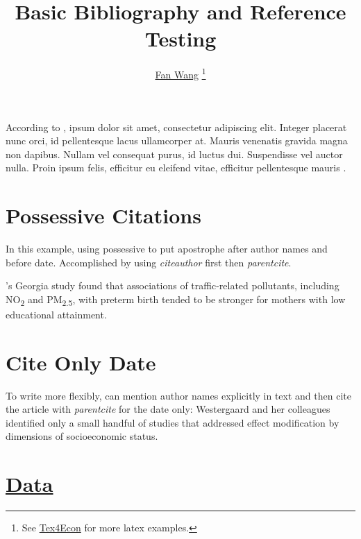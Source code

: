\documentclass[12pt,english]{article}
\begin{document}
\title{Basic Bibliography and Reference Testing}
\author{\href{http://fanwangecon.github.io/}{Fan Wang} \thanks{See \href{https://fanwangecon.github.io/Tex4Econ/}{Tex4Econ} for more latex examples.}}

\maketitle

According to \textcite{becker_human_1986}, ipsum dolor sit amet, consectetur adipiscing elit. Integer placerat nunc orci, id pellentesque lacus ullamcorper at. Mauris venenatis gravida magna non dapibus. Nullam vel consequat purus, id luctus dui. Suspendisse vel auctor nulla. Proin ipsum felis, efficitur eu eleifend vitae, efficitur pellentesque mauris \autocite{case_lasting_2005, conti_understanding_2010}.

\section{Possessive Citations}

In this example, using possessive to put apostrophe after author names and before date. Accomplished by using \emph{citeauthor} first then \emph{parentcite}.

\citeauthor{hao_air_2016}'s \parencite*{hao_air_2016} Georgia study
found that associations of traffic-related pollutants, including NO\textsubscript{2} and
PM\textsubscript{2.5}, with preterm birth tended to be stronger for mothers with low
educational attainment.

\section{Cite Only Date}

To write more flexibly, can mention author names explicitly in text and then cite the article with \emph{parentcite} for the date only: Westergaard and her colleagues \parencite*{westergaard_ambient_2017} identified only a small handful of studies that addressed effect modification by dimensions of socioeconomic status.

\section{\href{https://papers.ssrn.com/sol3/papers.cfm?abstract_id=3140132}{Data}}
\end{document}
